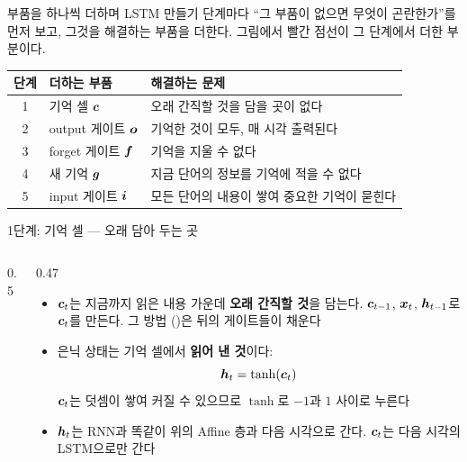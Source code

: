 \documentclass[aspectratio=169,11pt]{beamer}
\begin{document}
\begin{frame}{부품을 하나씩 더하며 LSTM 만들기}
단계마다 ``그 부품이 없으면 무엇이 곤란한가''를 먼저 보고, 그것을 해결하는 부품을 더한다.
그림에서 빨간 점선이 그 단계에서 더한 부분이다.
\vskip3mm
\centering
\begin{tabular}{@{}cll@{}}
\toprule
단계 & 더하는 부품 & 해결하는 문제 \\
\midrule
1 & 기억 셀 $\bm{c}$ & 오래 간직할 것을 담을 곳이 없다 \\
2 & output 게이트 $\bm{o}$ & 기억한 것이 모두, 매 시각 출력된다 \\
3 & forget 게이트 $\bm{f}$ & 기억을 지울 수 없다 \\
4 & 새 기억 $\bm{g}$ & 지금 단어의 정보를 기억에 적을 수 없다 \\
5 & input 게이트 $\bm{i}$ & 모든 단어의 내용이 쌓여 중요한 기억이 묻힌다 \\
\bottomrule
\end{tabular}
\end{frame}

\begin{frame}{1단계: 기억 셀 --- 오래 담아 두는 곳}
\begin{columns}[c,onlytextwidth]
\begin{column}{0.5\textwidth}
\end{column}
\begin{column}{0.47\textwidth}
\small
\begin{itemize}
\item $\bm{c}_t$는 지금까지 읽은 내용 가운데 \textbf{오래 간직할 것}을 담는다.
$\bm{c}_{t-1}$, $\bm{x}_t$, $\bm{h}_{t-1}$로 $\bm{c}_t$를 만든다.
그 방법 ()은 뒤의 게이트들이 채운다
\item 은닉 상태는 기억 셀에서 \textbf{읽어 낸 것}이다:
\[
\bm{h}_t=\tanh(\bm{c}_t)
\]
$\bm{c}_t$는 덧셈이 쌓여 커질 수 있으므로 $\tanh$로 $-1$과 $1$ 사이로 누른다
\item $\bm{h}_t$는 RNN과 똑같이 위의 Affine 층과 다음 시각으로 간다.
$\bm{c}_t$는 다음 시각의 LSTM으로만 간다
\end{itemize}
\end{column}
\end{columns}
\end{frame}
\end{document}
